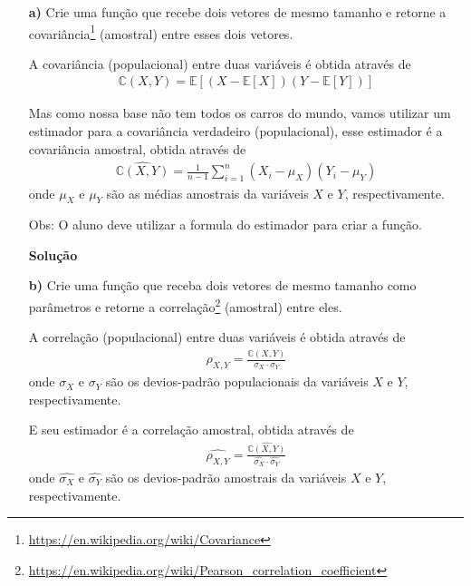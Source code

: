 \documentclass[12pt, a4paper]{article}
\begin{document}
\begin{itemize}
	\item[\textbf{a)}] Crie uma função que recebe dois vetores de mesmo tamanho e retorne a covariância\footnote{\url{https://en.wikipedia.org/wiki/Covariance}} (amostral) entre esses dois vetores.
	
	A covariância (populacional) entre duas variáveis é obtida através de
	\begin{align*}
		\mathbb{C}(X, Y) = \mathbb{E}\left[ (X - \mathbb{E}[X]) (Y - \mathbb{E}[Y]) \right]
	\end{align*}
	
	Mas como nossa base não tem todos os carros do mundo, vamos utilizar um estimador para a covariância verdadeiro (populacional), esse estimador é a covariância amostral, obtida através de
	\begin{align*}
		\widehat{\mathbb{C}(X, Y)} = \frac{1}{n-1} \sum_{i=1}^n (X_i - \mu_{X})(Y_i - \mu_{Y})
	\end{align*}
	onde $\mu_{X}$ e $\mu_{Y}$ são as médias amostrais da variáveis $X$ e $Y$, respectivamente.
	
	Obs: O aluno deve utilizar a formula do estimador para criar a função.
	
	\textbf{Solução}
	
	
	
	
	
	\item[\textbf{b)}] Crie uma função que receba dois vetores de mesmo tamanho como parâmetros e retorne a correlação\footnote{\url{https://en.wikipedia.org/wiki/Pearson_correlation_coefficient}} (amostral) entre eles.
	
	A correlação (populacional) entre duas variáveis é obtida através de
	\begin{align*}
		\rho_{X, Y} = \frac{\mathbb{C}(X, Y)}{\sigma_X\cdot \sigma_Y}
	\end{align*}
	onde $\sigma_X$ e $\sigma_Y$ são os devios-padrão populacionais da variáveis $X$ e $Y$, respectivamente.
	
	E seu estimador é a correlação amostral, obtida através de
	\begin{align*}
		\widehat{\rho_{X, Y}} = \frac{\widehat{\mathbb{C}(X, Y)}}{\widehat{\sigma_X}\cdot \widehat{\sigma_Y}}
	\end{align*}
	onde $\widehat{\sigma_X}$ e $\widehat{\sigma_Y}$ são os devios-padrão amostrais da variáveis $X$ e $Y$, respectivamente.
	

\end{itemize}
\end{document}
